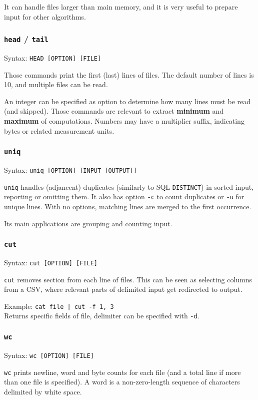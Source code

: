 It can handle files larger than main memory, and it is very useful to prepare input for other algorithms.

\subsubsection{\texttt{head} / \texttt{tail}}
Syntax: \texttt{HEAD [OPTION] [FILE]}

Those commands print the first (last) lines of files. The default number of lines is 10, and multiple files can be read. 

An integer can be specified as option to determine how many lines must be read (and skipped). Those commands are relevant to extract \textbf{minimum} and \textbf{maximum} of computations. Numbers may have a multiplier suffix, indicating bytes or related measurement units.

\subsubsection{\texttt{uniq}}
Syntax: \texttt{uniq [OPTION] [INPUT [OUTPUT]]}

\texttt{uniq} handles (adjancent) duplicates (similarly to SQL \texttt{DISTINCT}) in sorted input, reporting or omitting them. It also has option \texttt{-c} to count duplicates or \texttt{-u} for unique lines. With no options, matching lines are merged to the first occurrence.

Its main applications are grouping and counting input.

\subsubsection{\texttt{cut}}
Syntax: \texttt{cut [OPTION] [FILE]}

\texttt{cut} removes section from each line of files. This can be seen as selecting columns from a CSV, where relevant parts of delimited input get redirected to output.

Example: \texttt{cat file | cut -f 1, 3} \\
Returns specific fields of file, delimiter can be specified with \texttt{-d}.

\subsubsection{\texttt{wc}}
Syntax: \texttt{wc [OPTION] [FILE]}

\texttt{wc} prints newline, word and byte counts for each file (and a total line if more than one file is specified). A word is a non-zero-length sequence of characters delimited by white space.

